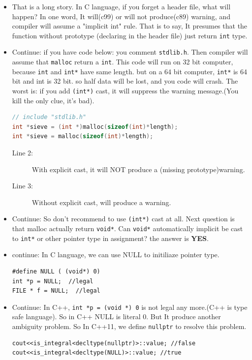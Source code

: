 \documentclass[a4paper,11pt,twoside]{book}
\begin{document}
\begin{itemize}
	\item That is a long story. In C language, if you forget a header file, what will happen? In one word, It will(c99) or will not produce(c89) warning, and compiler will assume a "implicit int" rule. That is to say, It presumes that the function without prototype (declaring in the header file) just return \texttt{int} type.
	
	\item Continue: if you have code below: you comment \texttt{stdlib.h}. Then compiler will assume that \texttt{malloc} return a \texttt{int}.  This code will run on 32 bit computer, because \texttt{int} and \texttt{int*} have same length. but on a 64 bit computer, \texttt{int*} is 64 bit and int is 32 bit.  so half data will be lost, and you code will crash. The worst is: if you add \texttt{(int*)} cast, it will suppress the warning message.(You kill the only clue, it's bad).
\begin{lstlisting}[frame=single, language=c++]
// include "stdlib.h"
int *sieve = (int *)malloc(sizeof(int)*length);	
int *sieve = malloc(sizeof(int)*length);
\end{lstlisting}
\begin{description}
	\item[Line 2:] With explicit cast, it will NOT produce a (missing prototype)warning.
	\item[Line 3:] Without explicit cast, will produce a warning.
\end{description}

	\item Continue: So don't recommend to use \texttt{(int*)} cast at all. Next question is that malloc actually return \texttt{void*}. Can \texttt{void*} automatically implicit be cast to \texttt{int*} or other pointer type in assignment? the answer is \textbf{YES}.
	
	\item  continue: In C language, we can use NULL to initiliaze pointer type.
\begin{lstlisting}[numbers=none]
#define NULL ( (void*) 0)
int *p = NULL;  //legal
FILE * f = NULL;  //legal
\end{lstlisting}
	
	\item Continue: In C++, \texttt{int *p = (void *) 0} is not legal any more.(C++ is type safe language).  So in C++ NULL is literal 0. But It produce another ambiguity problem.  So In C++11, we define \texttt{nullptr} to resolve this problem.
\begin{lstlisting}[numbers=none]
cout<<is_integral<decltype(nullptr)>::value; //false
cout<<is_integral<decltype(NULL)>::value; //true


\end{lstlisting}
\end{itemize}
\end{document}
